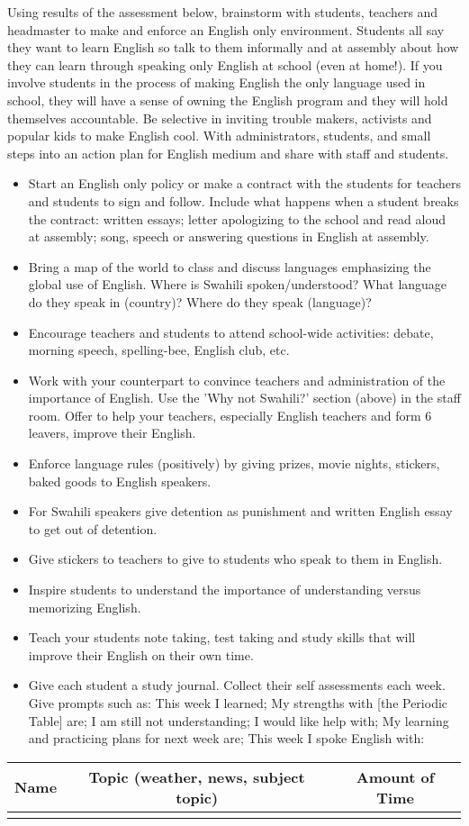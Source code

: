 Using results of the assessment below, brainstorm with students, teachers
and headmaster to make and enforce an English only environment. Students
all say they want to learn English so talk to them informally and
at assembly about how they can learn through speaking only English
at school (even at home!). If you involve students in the process
of making English the only language used in school, they will have
a sense of owning the English program and they will hold themselves
accountable. Be selective in inviting trouble makers, activists and
popular kids to make English cool. With administrators, students,
and small steps into an action plan for English medium and share with
staff and students.
\begin{itemize}
\item Start an English only policy or make a contract with the students
for teachers and students to sign and follow. Include what happens
when a student breaks the contract: written essays; letter apologizing
to the school and read aloud at assembly; song, speech or answering
questions in English at assembly.
\item Bring a map of the world to class and discuss languages emphasizing
the global use of English. Where is Swahili spoken/understood? What
language do they speak in (country)? Where do they speak (language)? 
\item Encourage teachers and students to attend school-wide activities:
debate, morning speech, spelling-bee, English club, etc.
\item Work with your counterpart to convince teachers and administration
of the importance of English. Use the 'Why not Swahili?' section (above)
in the staff room. Offer to help your teachers, especially English
teachers and form 6 leavers, improve their English.
\item Enforce language rules (positively) by giving prizes, movie nights,
stickers, baked goods to English speakers.
\item For Swahili speakers give detention as punishment and written English
essay to get out of detention. 
\item Give stickers to teachers to give to students who speak to them in
English. 
\item Inspire students to understand the importance of understanding versus
memorizing English. 
\item Teach your students note taking, test taking and study skills that
will improve their English on their own time.
\item Give each student a study journal. Collect their self assessments each
week. Give prompts such as: This week I learned; My strengths with
{[}the Periodic Table{]} are; I am still not understanding; I would
like help with; My learning and practicing plans for next week are;
This week I spoke English with:
\end{itemize}
\begin{center}
\begin{tabular}{|c|c|c|}
\hline 
Name & Topic (weather, news, subject topic) & Amount of Time\tabularnewline
\hline 
\hline 
 &  & \tabularnewline
\hline 
\end{tabular}
\end{center}


